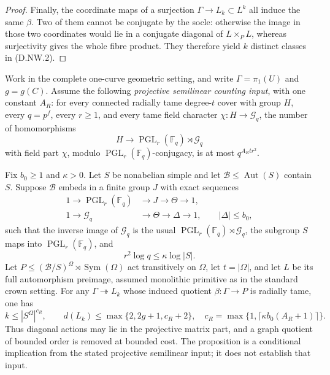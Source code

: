 \begin{proof}
Finally, the coordinate maps of a surjection
$\Gamma\to L_k\subset L^k$ all induce the same
$\beta$. Two of them cannot be conjugate by the
socle: otherwise the image in those two coordinates
would lie in a conjugate diagonal of $L\times_P L$,
whereas surjectivity gives the whole fibre product.
They therefore yield $k$ distinct classes in (D.NW.2).
\end{proof}

\begin{proposition}
\label{D:bounded-graph-projective-crown-reduction}
Work in the complete one-curve geometric setting, and
write $\Gamma=\pi_1(U)$ and $g=g(C)$. Assume the following
\emph{projective semilinear counting input}, with one
constant $A_R$:
for every connected radially tame degree-$t$ cover with
group $H$, every $q=p^f$, every $r\geq1$, and every
tame field character $\chi:H\to\mathcal G_q$, the
number of homomorphisms
\[
 H\longrightarrow\operatorname{PGL}_r(\mathbb F_q)
                                  \rtimes\mathcal G_q
\]
with field part $\chi$, modulo
$\operatorname{PGL}_r(\mathbb F_q)$-conjugacy, is at
most $q^{A_Rtr^2}$.

Fix $b_0\geq1$ and $\kappa>0$. Let $S$ be nonabelian
simple and let $\mathcal B\leq\operatorname{Aut}(S)$
contain $S$. Suppose $\mathcal B$ embeds in a finite
group $J$ with exact sequences
\[
 \begin{split}
 1\to\operatorname{PGL}_r(\mathbb F_q)&\to J
          \to\Theta\to1,\\
 1\to\mathcal G_q&\to\Theta\to\Delta\to1,
             \qquad |\Delta|\leq b_0,
 \end{split}                                           \tag{D.NW.7}
\]
such that the inverse image of $\mathcal G_q$ is the
usual $\operatorname{PGL}_r(\mathbb F_q)\rtimes\mathcal G_q$,
the subgroup $S$ maps into $\operatorname{PGL}_r(\mathbb F_q)$,
and
\[
                    r^2\log q\leq\kappa\log|S|.
                                                        \tag{D.NW.8}
\]
Let $P\leq(\mathcal B/S)^\Omega\rtimes\operatorname{Sym}(\Omega)$
act transitively on $\Omega$, let $t=|\Omega|$, and let
$L$ be its full automorphism preimage, assumed monolithic
primitive as in the standard crown setting. For any
$\Gamma\twoheadrightarrow L_k$ whose induced quotient
$\beta:\Gamma\to P$ is radially tame, one has
\[
 k\leq |S^\Omega|^{c_R},\qquad
 d(L_k)\leq\max\{2,2g+1,c_R+2\},
 \quad c_R=\max\{1,\lceil\kappa b_0(A_R+1)\rceil\}.
                                                        \tag{D.NW.9}
\]
Thus diagonal actions may lie in the projective matrix
part, and a graph quotient of bounded order is removed
at bounded cost. The proposition is a conditional
implication from the stated projective semilinear input;
it does not establish that input.
\end{proposition}

